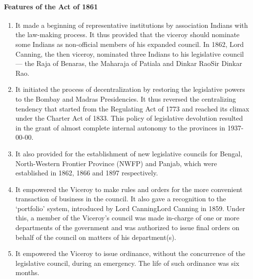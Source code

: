 \begin{multicols}{2}
\paragraph{Features of the Act of 1861}
\begin{enumerate}
  \item It made a beginning of representative institutions by association Indians with the law-making process. It thus provided that the viceroy should nominate some Indians as non-official members of his expanded council. In 1862, Lord Canning, the then viceroy, nominated three Indians to his legislative council — the Raja of Benaras, the Maharaja of Patiala and Dinkar RaoSir Dinkar Rao.
  \item It initiated the process of decentralization by restoring the legislative powers to the Bombay and Madras Presidencies. It thus reversed the centralizing tendency that started from the Regulating Act of 1773 and reached its climax under the Charter Act of 1833. This policy of legislative devolution resulted in the grant of almost complete internal autonomy to the provinces in 1937-00-00.
  \item It also provided for the establishment of new legislative councils for Bengal, North-Western Frontier Province (NWFP) and Panjab, which were established in 1862, 1866 and 1897 respectively.
  \item It empowered the Viceroy to make rules and orders for the more convenient transaction of business in the council. It also gave a recognition to the  `portfolio' system, introduced by Lord CanningLord Canning in 1859. Under this, a member of the Viceroy's council was made in-charge of one or more departments of the government and was authorized to issue final orders on behalf of the council on matters of his department(s).
  \item It empowered the Viceroy to issue ordinance, without the concurrence of the legislative council, during an emergency. The life of such ordinance was six months.
\end{enumerate}


\end{multicols}
